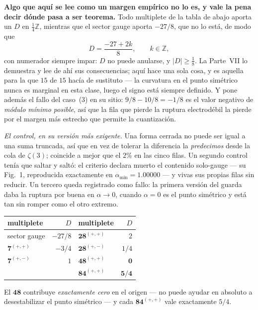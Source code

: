 \documentclass[11pt,a4paper]{article}
\newcommand{\ZZ}{\mathbb{Z}}
\newcommand{\rep}[1]{\mathbf{#1}}
\newcommand{\amin}{\alpha_{\min}}
\begin{document}
\textbf{Algo que aquí se lee como un margen empírico no lo es, y vale la pena decir dónde pasa a ser
teorema.} Todo multiplete de la tabla de abajo aporta un $D$ en $\tfrac14\ZZ$, mientras que el sector
gauge aporta $-27/8$, que no lo está, de modo que
\[
  D=\frac{-27+2k}{8},\qquad k\in\ZZ,
\]
con numerador siempre impar: $D$ no puede anularse, y $|D|\ge\tfrac18$. La Parte~VII \cite{PartVII} lo
demuestra y lee de ahí sus consecuencias; aquí hace una sola cosa, y es aquella para la que $15$ de
$15$ hacía de sustituto --- la curvatura en el punto simétrico nunca es marginal en esta clase, luego
el signo está siempre definido. Y pone además el fallo del caso~(3) en su sitio: $9/8-10/8=-1/8$ es
el valor negativo de \emph{módulo mínimo posible}, así que la fila que pierde la ruptura electrodébil
la pierde por el margen más estrecho que permite la cuantización.

\emph{El control, en su versión más exigente.} Una forma cerrada no puede ser igual a una suma truncada, así
que en vez de tolerar la diferencia la \emph{predecimos} desde la cola de $\zeta(3)$; coincide a
mejor que el $2\%$ en las cinco filas. Un segundo control tenía que saltar y saltó: el
criterio declara muerto el contenido solo-gauge --- su Fig.~1, reproducida exactamente en
$\amin=1.00000$ --- y vivas sus propias filas sin reducir. Un tercero queda registrado como fallo: la
primera versión del guarda daba la ruptura por buena en $\alpha\to0$, cuando $\alpha=0$ es el punto
simétrico y está tan sin romper como el otro extremo.

\begin{center}\small
\begin{tabular}{lr@{\qquad}lr}
\toprule
\rowcolor{hdrblue!12}
multiplete & $D$ & multiplete & $D$\\
\midrule
sector gauge & $-27/8$ & $\rep{28}^{(+,+)}$ & $2$\\
$\rep7^{(+,+)}$ & $-3/4$ & $\rep{28}^{(+,-)}$ & $1/4$\\
$\rep7^{(+,-)}$ & $1$ & \cellcolor{hdrblue!16}$\rep{48}^{(+,+)}$ &
\cellcolor{hdrblue!16}$\mathbf{0}$\\
& & \cellcolor{amber!18}$\rep{84}^{(+,+)}$ & \cellcolor{amber!18}$\mathbf{5/4}$\\
\bottomrule
\end{tabular}
\end{center}

El $\rep{48}$ contribuye \emph{exactamente cero} en el origen --- no puede ayudar en absoluto a
desestabilizar el punto simétrico --- y cada $\rep{84}^{(+,+)}$ vale exactamente $5/4$.
\end{document}
